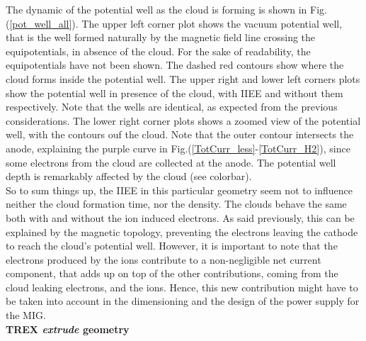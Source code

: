 \noindent The dynamic of the potential well as the cloud is forming is shown in Fig.(\ref{pot_well_all}). The upper left corner plot shows the vacuum potential well, that is the well formed naturally by the magnetic field line crossing the equipotentials, in absence of the cloud. For the sake of readability, the equipotentials have not been shown. The dashed red contours show where the cloud forms inside the potential well. The upper right and lower left corners plots show the potential well in presence of the cloud, with IIEE and without them respectively. Note that the wells are identical, as expected from the previous considerations. The lower right corner plots shows a zoomed view of the potential well, with the contours ouf the cloud. Note that the outer contour intersects the anode, explaining the purple curve in Fig.(\ref{TotCurr_less}-\ref{TotCurr_H2}), since some electrons from the cloud are collected at the anode. The potential well depth is remarkably affected by the cloud (see colorbar).\\

So to sum things up, the IIEE in this particular geometry seem not to influence neither the cloud formation time, nor the density. The clouds behave the same both with and without the ion induced electrons. As said previously, this can be explained by the magnetic topology, preventing the electrons leaving the cathode to reach the cloud's potential well. However, it is important to note that the electrons produced by the ions contribute to a non-negligible net current component, that adds up on top of the other contributions, coming from the cloud leaking electrons, and the ions. Hence, this new contribution might have to be taken into account in the dimensioning and the design of the power supply for the MIG. \\

\textbf{TREX \emph{extrude} geometry}\\

